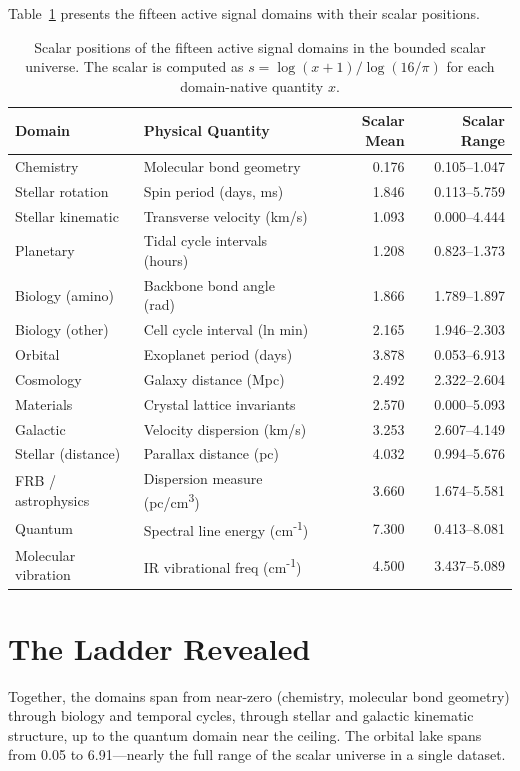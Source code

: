 \documentclass[11pt, letterpaper, openany]{book}
\begin{document}
Table~\ref{tab:scalar_ladder} presents the fifteen active signal domains with their scalar
positions.

\begin{table}[H]
\centering
\renewcommand{\arraystretch}{1.4}
\begin{tabular}{|l|l|r|r|}
\hline
\textbf{Domain} & \textbf{Physical Quantity} & \textbf{Scalar Mean} & \textbf{Scalar Range} \\
\hline
Chemistry & Molecular bond geometry & 0.176 & 0.105--1.047 \\
Stellar rotation & Spin period (days, ms) & 1.846 & 0.113--5.759 \\
Stellar kinematic & Transverse velocity (km/s) & 1.093 & 0.000--4.444 \\
Planetary & Tidal cycle intervals (hours) & 1.208 & 0.823--1.373 \\
Biology (amino) & Backbone bond angle (rad) & 1.866 & 1.789--1.897 \\
Biology (other) & Cell cycle interval (ln min) & 2.165 & 1.946--2.303 \\
Orbital & Exoplanet period (days) & 3.878 & 0.053--6.913 \\
Cosmology & Galaxy distance (Mpc) & 2.492 & 2.322--2.604 \\
Materials & Crystal lattice invariants & 2.570 & 0.000--5.093 \\
Galactic & Velocity dispersion (km/s) & 3.253 & 2.607--4.149 \\
Stellar (distance) & Parallax distance (pc) & 4.032 & 0.994--5.676 \\
FRB / astrophysics & Dispersion measure (pc/cm\textsuperscript{3}) & 3.660 & 1.674--5.581 \\
Quantum & Spectral line energy (cm\textsuperscript{-1}) & 7.300 & 0.413--8.081 \\
Molecular vibration & IR vibrational freq (cm\textsuperscript{-1}) & 4.500 & 3.437--5.089 \\
\hline
\end{tabular}
\caption{Scalar positions of the fifteen active signal domains in the bounded scalar universe.
The scalar is computed as $s = \log(x+1)/\log(16/\pi)$ for each domain-native quantity $x$.}
\label{tab:scalar_ladder}
\end{table}

\section*{The Ladder Revealed}
Together, the domains span from near-zero (chemistry, molecular bond geometry) through
biology and temporal cycles, through stellar and galactic kinematic structure, up to the
quantum domain near the ceiling. The orbital lake spans from 0.05 to 6.91---nearly the full
range of the scalar universe in a single dataset.
\end{document}
